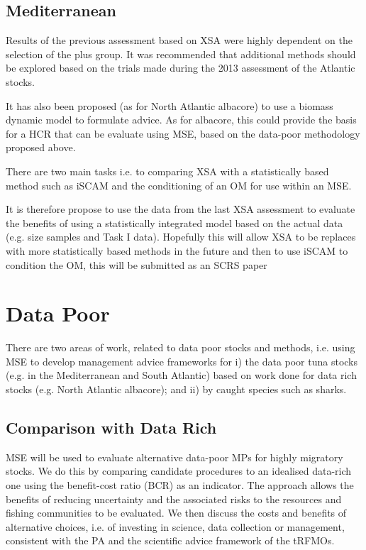 \documentclass[a4paper,10pt]{article}
\begin{document}
\subsection{Mediterranean}

Results of the previous assessment based on XSA were highly dependent on the selection of the plus group. It was
recommended that additional methods should be explored based on the trials made during the 2013 assessment of the Atlantic stocks.

It has also been proposed (as for North Atlantic albacore) to use a biomass dynamic model to formulate advice. As for albacore, this could provide the 
basis  for a HCR that can be evaluate using MSE, based on the data-poor methodology proposed above. 

There are two main tasks i.e. to comparing XSA with a statistically based method such as iSCAM and 
the conditioning of an OM for use within an MSE. 

It is therefore propose to use the data from the last XSA assessment to evaluate the benefits of using a statistically
integrated model based on the actual data (e.g. size samples and Task I data). Hopefully this will allow XSA to be replaces 
with more statistically based methods in the future and then to use iSCAM to condition the OM, this will be submitted as
an SCRS paper 


\section{Data Poor}

There are two areas of work, related to data poor stocks and methods, i.e. using MSE to
develop management advice frameworks for i) the data poor tuna stocks (e.g. in the Mediterranean and
South Atlantic) based on work done for data rich stocks (e.g. North Atlantic albacore); and 
ii) by caught species such as sharks.

\subsection{Comparison with Data Rich}

\gls{MSE} will be used to evaluate alternative data-poor MPs for highly 
migratory stocks. We do this by comparing candidate procedures to an idealised data-rich one
using the benefit-cost ratio (BCR) as an indicator. The approach  
allows the benefits of reducing uncertainty and the associated risks to the resources 
and fishing communities to be evaluated. We then discuss the costs and benefits of alternative choices, 
i.e. of investing in science, data collection or management, consistent with the \gls{PA} and the
scientific advice framework of the \gls{tRFMOs}.
\end{document}
